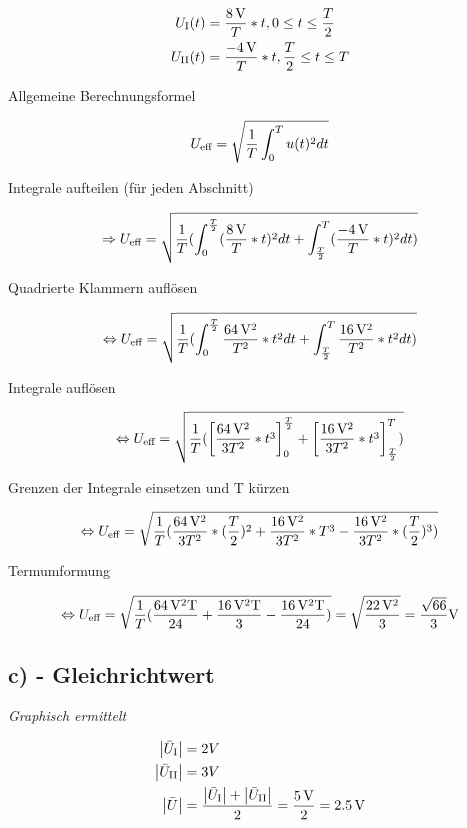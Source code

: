 \documentclass[../../document.tex]{subfiles}
\begin{document}
\begin{equation*}
    \begin{split}
        U_{\textrm{I}} (t) &= \frac{\SI{8}{\volt}}{T} * t, 0 \leq t \leq \frac{T}{2}\\
        U_{\textrm{II}} (t) &= \frac{\SI{-4}{\volt}}{T} * t, \frac{T}{2} \leq t \leq T\\
    \end{split}
\end{equation*}

Allgemeine Berechnungsformel

\[U_{\textrm{eff}} = \sqrt{\frac{1}{T} \int_{0}^{T} u(t)^2 dt}\]

Integrale aufteilen (für jeden Abschnitt)

\[\Rightarrow U_{\textrm{eff}} = \sqrt{\frac{1}{T} ( \int_{0}^{\frac{T}{2}} ( \frac{\SI{8}{\volt}}{T} * t )^2 dt + \int_{\frac{T}{2}}^{T} (\frac{\SI{-4}{\volt}}{T} * t)^2 dt )}\]

Quadrierte Klammern auflösen

\[\Leftrightarrow U_{\textrm{eff}} = \sqrt{\frac{1}{T} ( \int_{0}^{\frac{T}{2}} \frac{\SI{64}{\volt^2}}{T^2} * t^2 dt + \int_{\frac{T}{2}}^{T} \frac{\SI{16}{\volt^2}}{T^2} * t^2 dt )}\]

Integrale auflösen

\[\Leftrightarrow U_{\textrm{eff}} = \sqrt{\frac{1}{T} ( \left[ \frac{\SI{64}{\volt^2}}{3T^2} * t^3 \right]_0^{\frac{T}{2}} + \left[ \frac{\SI{16}{\volt^2}}{3T^2} * t^3 \right]_{\frac{T}{2}}^{T} ) }\]

Grenzen der Integrale einsetzen und T kürzen

\[\Leftrightarrow U_{\textrm{eff}} = \sqrt{\frac{1}{T} ( \frac{\SI{64}{\volt^2}}{3T^2} * (\frac{T}{2})^2 + \frac{\SI{16}{\volt^2}}{3T^2} * T^3 - \frac{\SI{16}{\volt^2}}{3T^2} * (\frac{T}{2})^3 )} \]

Termumformung

\[\Leftrightarrow U_{\textrm{eff}} = \sqrt{\frac{1}{T} (\frac{\SI{64}{\volt^2T}}{24} + \frac{\SI{16}{\volt^2T}}{3} - \frac{\SI{16}{\volt^2T}}{24})} = \sqrt{\frac{\SI{22}{\volt^2}}{3}} = \frac{\sqrt{66}}{3}\SI{}{V}\]

\newpage

\subsection*{c) - Gleichrichtwert}

\emph{Graphisch ermittelt}

\begin{equation*}
    \begin{split}
        \left\lvert \bar{U}_{\textrm{I}} \right\rvert &= 2V\\
        \left\lvert \bar{U}_{\textrm{II}} \right\rvert &= 3V\\
        \left\lvert \bar{U} \right\rvert &= \frac{ \left\lvert \bar{U}_{\textrm{I}} \right\rvert + \left\lvert \bar{U}_{\textrm{II}} \right\rvert }{2} = \frac{\SI{5}{\volt}}{2} = \SI{2,5}{\volt}\\
    \end{split}
\end{equation*}
\end{document}

